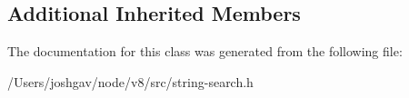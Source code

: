 \subsection*{Additional Inherited Members}


The documentation for this class was generated from the following file\+:\begin{DoxyCompactItemize}
\item 
/\+Users/joshgav/node/v8/src/string-\/search.\+h\end{DoxyCompactItemize}
